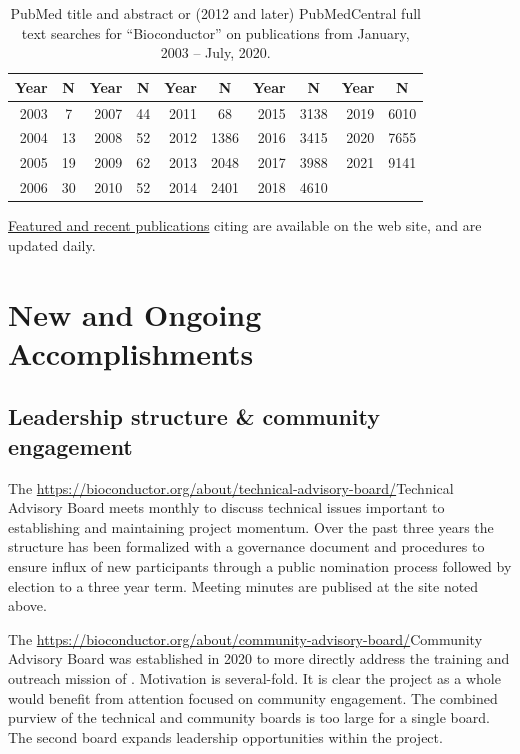 \documentclass[letterpaper]{article}
\begin{document}
\begin{table}
  \caption{PubMed title and abstract or (2012 and later) PubMedCentral full text searches for ``Bioconductor'' on
    publications from January, 2003 -- July, 2020.}
  \label{table:pubMed}
  \begin{center}
    \begin{tabular}{rc|rc|rc|rc|rc}
      Year &  N & Year &  N & Year &    N & Year  & N    & Year  & N\\\hline\noalign{\smallskip}
      2003 &  7 & 2007 & 44 & 2011 &   68 & 2015  & 3138 & 2019  & 6010 \\
      2004 & 13 & 2008 & 52 & 2012 & 1386 & 2016  & 3415 & 2020 & 7655 \\
      2005 & 19 & 2009 & 62 & 2013 & 2048 & 2017  & 3988 & 2021 & 9141 \\
      2006 & 30 & 2010 & 52 & 2014 & 2401 & 2018  & 4610 & \\
    \end{tabular}
  \end{center}
\end{table}

\href{https://bioconductor.org/help/publications/}{Featured and recent
  publications} citing \Bioconductor{} are available on the
\Bioconductor{} web site, and are updated daily. 

\section{New and Ongoing Accomplishments}

\subsection{Leadership structure \& community engagement}

The \url{https://bioconductor.org/about/technical-advisory-board/}{Technical Advisory Board} meets
monthly to discuss technical issues important to establishing and
maintaining project momentum. Over the past three years the structure
has been formalized with a governance document and procedures to
ensure influx of new participants through a public nomination process
followed by election to a three year term. 
Meeting minutes are publised at the site noted above.

The \url{https://bioconductor.org/about/community-advisory-board/}{Community Advisory Board} was established in 2020 to more
directly address the training and outreach mission of
\Bioconductor. Motivation is several-fold. It is clear the project as
a whole would benefit from attention focused on community
engagement. The combined purview of the technical and community boards
is too large for a single board. The second board expands leadership
opportunities within the project.
\end{document}
